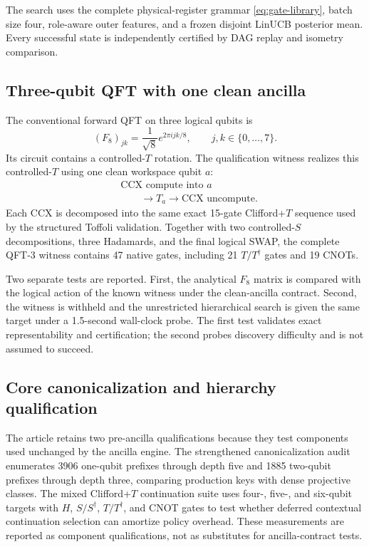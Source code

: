 The search uses the complete physical-register grammar \eqref{eq:gate-library}, batch size four, role-aware outer features, and a frozen disjoint LinUCB posterior mean. Every successful state is independently certified by DAG replay and isometry comparison.

\subsection{Three-qubit QFT with one clean ancilla}

The conventional forward QFT on three logical qubits is
\begin{equation}
(F_8)_{jk}=\frac{1}{\sqrt8}e^{2\pi ijk/8},
\qquad j,k\in\{0,\ldots,7\}.
\label{eq:qft3}
\end{equation}
Its circuit contains a controlled-$T$ rotation. The qualification witness realizes this controlled-$T$ using one clean workspace qubit $a$:
\begin{equation}
\begin{aligned}
&\text{CCX compute into }a\\
&\qquad\rightarrow T_a
\rightarrow\text{CCX uncompute}.
\end{aligned}
\end{equation}
Each CCX is decomposed into the same exact 15-gate Clifford+$T$ sequence used by the structured Toffoli validation. Together with two controlled-$S$ decompositions, three Hadamards, and the final logical SWAP, the complete QFT-3 witness contains 47 native gates, including 21 $T/T^\dagger$ gates and 19 CNOTs.

Two separate tests are reported. First, the analytical $F_8$ matrix is compared with the logical action of the known witness under the clean-ancilla contract. Second, the witness is withheld and the unrestricted hierarchical search is given the same target under a 1.5-second wall-clock probe. The first test validates exact representability and certification; the second probes discovery difficulty and is not assumed to succeed.

\subsection{Core canonicalization and hierarchy qualification}

The article retains two pre-ancilla qualifications because they test components used unchanged by the ancilla engine. The strengthened canonicalization audit enumerates 3906 one-qubit prefixes through depth five and 1885 two-qubit prefixes through depth three, comparing production keys with dense projective classes. The mixed Clifford+$T$ continuation suite uses four-, five-, and six-qubit targets with $H$, $S/S^\dagger$, $T/T^\dagger$, and CNOT gates to test whether deferred contextual continuation selection can amortize policy overhead. These measurements are reported as component qualifications, not as substitutes for ancilla-contract tests.

